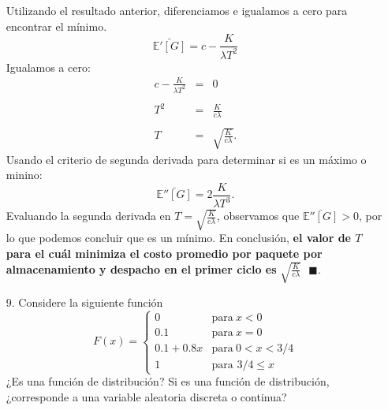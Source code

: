 \documentclass[11pt,letterpaper]{article}
\newcommand{\mE}{\mathbb{E}}
\newcommand{\finf}{\blacksquare.}
\begin{document}
\begin{itemize}
Utilizando el resultado anterior, diferenciamos e igualamos a cero para encontrar el mínimo.
$$\bar{\mE'[G]}=c-\frac{K}{\lambda T^2}$$
Igualamos a cero:
\begin{equation*}
\begin{array}{ccc}
c-\frac{K}{\lambda T^2} &=& 0\\
&&\\
T^2&=&\frac{K}{c\lambda}\\
&&\\
T&=&\sqrt{\frac{K}{c\lambda}}.
\end{array}
\end{equation*}
Usando el criterio de segunda derivada para determinar si es un máximo o minino:
$$\bar{\mE''[G]}=2\frac{K}{\lambda T^3}.$$
Evaluando la segunda derivada en $T=\sqrt{\frac{K}{c\lambda}}$, observamos que $\bar{\mE''[G]}>0$, por lo que podemos concluir que es un mínimo. En conclusión, \textbf{el valor de $T$ para el cuál minimiza el costo promedio por paquete por almacenamiento y despacho en el primer ciclo es} $\sqrt{\frac{K}{c\lambda}}\ \ \ \finf$
\item[9.] Considere la siguiente función
\begin{equation*}
F(x)=\left\{ \begin{array}{cl}
0 & \text{para} \ x<0\\
0.1 & \text{para} \ x=0\\
0.1+0.8x & \text{para} \ 0<x<3/4\\
1 & \text{para } 3/4\leq x
\end{array} \right.
\end{equation*}
¿Es una función de distribución? Si es una función de distribución, ¿corresponde a una variable
aleatoria discreta o continua?


\end{itemize}
\end{document}
